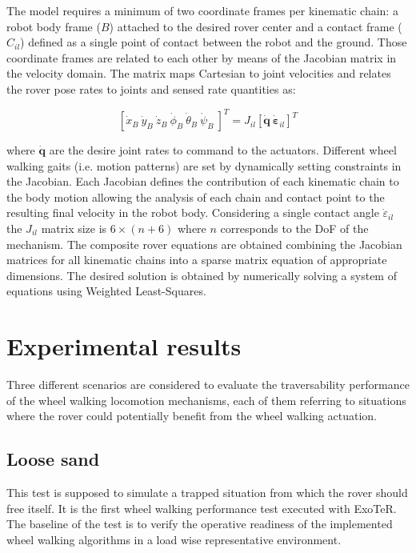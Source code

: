 \documentclass[a4paper,twocolumn]{esapub2005} %
\begin{document}
The model requires a minimum of two coordinate frames per kinematic chain: a
robot body frame ($B$) attached to the desired rover center and a contact frame
($C_{il}$) defined as a single point of contact between the robot and the
ground. Those coordinate frames are related to each other by means of the
Jacobian matrix in the velocity domain. The matrix maps Cartesian to joint
velocities and relates the rover pose rates to joints and sensed rate
quantities as:

\begin{equation}
    \left[\dot{x}_{B} ~ \dot{y}_{B} ~ \dot{z}_{B} ~ \dot{\phi}_{B}
    ~ \dot{\theta}_{B} ~ \dot{\psi}_{B} ~ \right]^T = J_{il}
    \left[\boldsymbol{\dot{q}} ~ \boldsymbol{\dot{\varepsilon}}_{il} \right]^T
    \label{eq:wheeljacobian}
\end{equation}

where $\boldsymbol{\dot{q}}$ are the desire joint rates to command to the
actuators.  Different wheel walking gaits (i.e. motion patterns) are set by
dynamically setting constraints in the Jacobian. Each Jacobian defines the
contribution of each kinematic chain to the body motion allowing the analysis
of each chain and contact point to the resulting final velocity in the robot
body.  Considering a single contact angle $\dot{\varepsilon}_{il}$ the $J_{il}$
matrix size is $6 \times (n + 6)$ where $n$ corresponds to the DoF of the
mechanism.  The composite rover equations are obtained combining the Jacobian
matrices for all kinematic chains into a sparse matrix equation of appropriate
dimensions. The desired solution is obtained by numerically solving a system of
equations using Weighted Least-Squares.



\section{Experimental results}

Three different scenarios are considered to evaluate the traversability
performance of the wheel walking locomotion mechanisms, each of them referring
to situations where the rover could potentially benefit from the wheel walking
actuation.

\subsection{Loose sand} This test is supposed to simulate a trapped situation
from which the rover should free itself. It is the first wheel walking
performance test executed with ExoTeR. The baseline of the test is to verify
the operative readiness of the implemented wheel walking algorithms in a load
wise representative environment.
\end{document}
